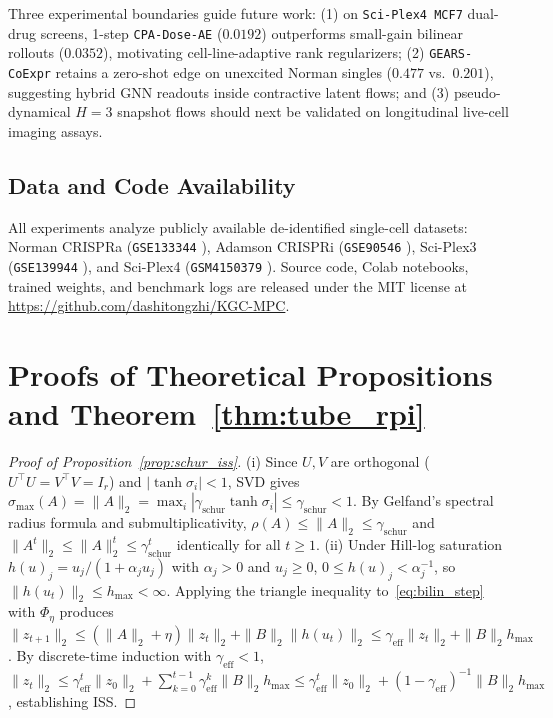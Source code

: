 \documentclass[journal]{IEEEtran}
\begin{document}
Three experimental boundaries guide future work: (1) on \texttt{Sci-\allowbreak Plex4 MCF7} dual-drug screens, 1-step \texttt{CPA-\allowbreak Dose-\allowbreak AE} ($0.0192$) outperforms small-gain bilinear rollouts ($0.0352$), motivating cell-line-adaptive rank regularizers; (2) \texttt{GEARS-\allowbreak CoExpr} retains a zero-shot edge on unexcited Norman singles ($0.477$ vs.\ $0.201$), suggesting hybrid GNN readouts inside contractive latent flows; and (3) pseudo-dynamical $H=3$ snapshot flows should next be validated on longitudinal live-cell imaging assays.

\subsection*{Data and Code Availability}
All experiments analyze publicly available de-identified single-cell datasets: Norman CRISPRa (\texttt{GSE133344} \cite{norman2019exploring}), Adamson CRISPRi (\texttt{GSE90546} \cite{adamson2016multiplexed}), Sci-Plex3 (\texttt{GSE139944} \cite{srivatsan2020massively}), and Sci-Plex4 (\texttt{GSM4150379} \cite{srivatsan2020massively}). Source code, Colab notebooks, trained weights, and benchmark logs are released under the MIT license at \url{https://github.com/dashitongzhi/KGC-MPC}.

\FloatBarrier
\appendices

\section{Proofs of Theoretical Propositions and Theorem~\ref{thm:tube_rpi}}

\begin{proof}[Proof of Proposition~\ref{prop:schur_iss}]
(i) Since $U, V$ are orthogonal ($U^\top U = V^\top V = I_r$) and $|\tanh\sigma_i| < 1$, SVD gives $\sigma_{\max}(A) = \|A\|_2 = \max_i |\gamma_{\mathrm{schur}}\tanh\sigma_i| \le \gamma_{\mathrm{schur}} < 1$. By Gelfand's spectral radius formula and submultiplicativity, $\rho(A) \le \|A\|_2 \le \gamma_{\mathrm{schur}}$ and $\|A^t\|_2 \le \|A\|_2^t \le \gamma_{\mathrm{schur}}^t$ identically for all $t \ge 1$.
(ii) Under Hill-log saturation $h(u)_j = u_j/(1+\alpha_j u_j)$ with $\alpha_j > 0$ and $u_j \ge 0$, $0 \le h(u)_j < \alpha_j^{-1}$, so $\|h(u_t)\|_2 \le h_{\max} < \infty$. Applying the triangle inequality to~\eqref{eq:bilin_step} with $\Phi_\eta$ produces $\|z_{t+1}\|_2 \le (\|A\|_2 + \eta)\|z_t\|_2 + \|B\|_2 \|h(u_t)\|_2 \le \gamma_{\mathrm{eff}}\|z_t\|_2 + \|B\|_2 h_{\max}$. By discrete-time induction with $\gamma_{\mathrm{eff}} < 1$, $\|z_t\|_2 \le \gamma_{\mathrm{eff}}^t\|z_0\|_2 + \sum_{k=0}^{t-1}\gamma_{\mathrm{eff}}^k\|B\|_2 h_{\max} \le \gamma_{\mathrm{eff}}^t\|z_0\|_2 + (1-\gamma_{\mathrm{eff}})^{-1}\|B\|_2 h_{\max}$, establishing ISS.
\end{proof}
\end{document}
